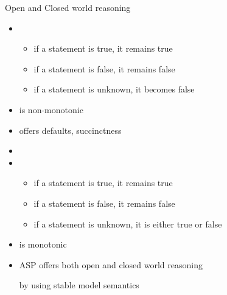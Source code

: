 \begin{frame}{Open and Closed world reasoning}
  \begin{itemize}
  \item<1-> 
    \begin{itemize}
    \item if a statement is true, it remains true
    \item if a statement is false, it remains false
    \item if a statement is unknown, it becomes false
    \end{itemize}
  \item<only@3->[] is non-monotonic
  \item<only@4->[] offers defaults, succinctness
  \item<only@1-3>[]
  \item<2-> 
    \begin{itemize}
    \item if a statement is true, it remains true
    \item if a statement is false, it remains false
    \item if a statement is unknown, it is either true or false
    \end{itemize}
  \item<only@3->[] is monotonic
    \medskip
  \item<only@5-> ASP offers both open and closed world reasoning

    by using stable model semantics
  \end{itemize}
\end{frame}
%
